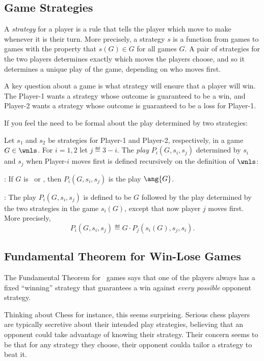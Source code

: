 \begin{definition}
\subsection{Game Strategies}

A \emph{strategy} for a player is a rule that tells the player which
move to make whenever it is their turn.  More precisely, a strategy
$s$ is a function from games to games with the property that $s(G) \in
G$ for all games $G$.  A pair of strategies for the two players
determines exactly which moves the players choose, and so it
determines a unique play of the game, depending on who moves first.

A key question about a game is what strategy will ensure that a player
will win.  The Player-1 wants a strategy whose outcome is guaranteed
to be a win, and Player-2 wants a strategy whose outcome is guaranteed
to be a loss for Player-1. 

\begin{staffnotes}
If you feel the need to be formal about the play determined by two
strategies:
\begin{definition*}
Let $s_1$ and $s_2$ be strategies for Player-1 and Player-2,
respectively, in a game $G \in \wnls$.  For $i=1,2$ let $j \eqdef
3-i$.  The \emph{play} $P_i(G,s_i,s_j)$ determined by $s_i$ and $s_j$
when Player-$i$ moves first is defined recursively on the definition
of $\wnls$:

: If $G$ is \winend\ or \loseend, then
$P_i(G,s_i,s_j)$ is the play $\ang{G}$.

: The play $P_i(G,s_i,s_j)$ is defined
to be $G$ followed by the play determined by the two strategies in the
game $s_i(G)$, except that now player $j$ moves first.  More
precisely,
\[
P_i(G,s_i,s_j) \eqdef G \cdot P_j(s_i(G),s_j,s_i).
\]
\end{definition*}
\end{staffnotes}

\subsection{Fundamental Theorem for Win-Lose Games}\label{FundThm_Games}

The Fundamental Theorem for \wnls\ games says that one of the players
always has a fixed ``winning'' strategy that guarantees a win against
\emph{every possible} opponent strategy.

Thinking about Chess for instance, this seems surprising.  Serious
chess players are typically secretive about their intended play
strategies, believing that an opponent could take advantage of knowing
their strategy.  Their concern seems to be that for any strategy they
choose, their opponent coulda tailor a strategy to beat it.


\end{definition}
